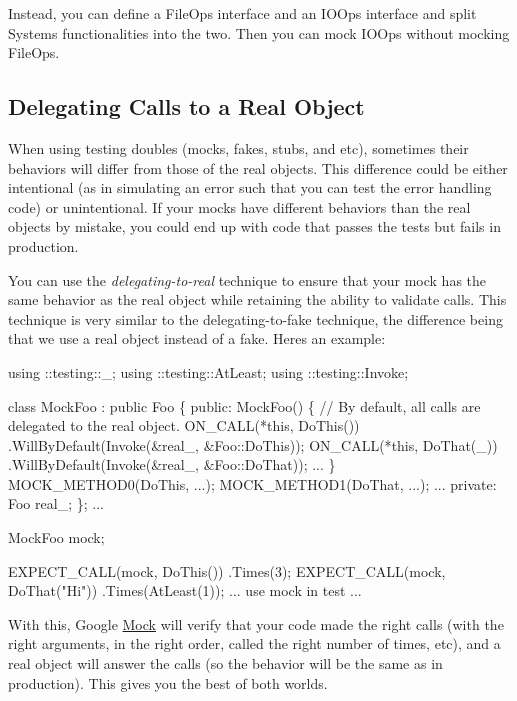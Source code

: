 Instead, you can define a {\ttfamily File\+Ops} interface and an {\ttfamily I\+O\+Ops} interface and split {\ttfamily System}\textquotesingle{}s functionalities into the two. Then you can mock {\ttfamily I\+O\+Ops} without mocking {\ttfamily File\+Ops}.

\subsection*{Delegating Calls to a Real Object}

When using testing doubles (mocks, fakes, stubs, and etc), sometimes their behaviors will differ from those of the real objects. This difference could be either intentional (as in simulating an error such that you can test the error handling code) or unintentional. If your mocks have different behaviors than the real objects by mistake, you could end up with code that passes the tests but fails in production.

You can use the {\itshape delegating-\/to-\/real} technique to ensure that your mock has the same behavior as the real object while retaining the ability to validate calls. This technique is very similar to the delegating-\/to-\/fake technique, the difference being that we use a real object instead of a fake. Here\textquotesingle{}s an example\+:


\begin{DoxyCode}
using ::testing::\_;
using ::testing::AtLeast;
using ::testing::Invoke;

\textcolor{keyword}{class }MockFoo : \textcolor{keyword}{public} Foo \{
 \textcolor{keyword}{public}:
  MockFoo() \{
    \textcolor{comment}{// By default, all calls are delegated to the real object.}
    ON\_CALL(*\textcolor{keyword}{this}, DoThis())
        .WillByDefault(Invoke(&real\_, &Foo::DoThis));
    ON\_CALL(*\textcolor{keyword}{this}, DoThat(\_))
        .WillByDefault(Invoke(&real\_, &Foo::DoThat));
    ...
  \}
  MOCK\_METHOD0(DoThis, ...);
  MOCK\_METHOD1(DoThat, ...);
  ...
 \textcolor{keyword}{private}:
  Foo real\_;
\};
...

  MockFoo mock;

  EXPECT\_CALL(mock, DoThis())
      .Times(3);
  EXPECT\_CALL(mock, DoThat(\textcolor{stringliteral}{"Hi"}))
      .Times(AtLeast(1));
  ... use mock in test ...
\end{DoxyCode}


With this, Google \hyperlink{classMock}{Mock} will verify that your code made the right calls (with the right arguments, in the right order, called the right number of times, etc), and a real object will answer the calls (so the behavior will be the same as in production). This gives you the best of both worlds.

